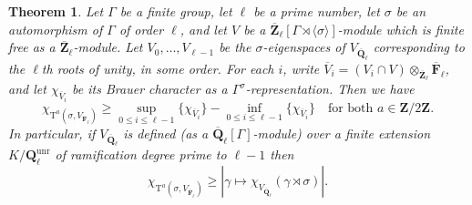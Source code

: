 \documentclass[reqno]{amsart}
\numberwithin{equation}{subsection}
\newcommand{\F}{\mathbf{F}}
\newcommand{\Q}{\mathbf{Q}}
\newcommand{\Z}{\mathbf{Z}}
\newcommand{\ol}[1]{\overline{#1}}
\newcommand{\rT}{\ensuremath{\mathrm{T}}\xspace}
\newtheorem{thm}{Theorem}[subsection]
\theoremstyle{remark}
\numberwithin{equation}{subsection}
\numberwithin{figure}{subsection}
\begin{document}
\begin{thm}\label{thm:eigenvalues-and-jordan-blocks-variant}
    Let $\Gamma$ be a finite group, let $\ell$ be a prime number, let $\sigma$ be an automorphism of $\Gamma$ of order $\ell$, and let $V$ be a $\ol\Z_\ell[\Gamma \rtimes \langle\sigma\rangle]$-module which is finite free as a $\ol\Z_\ell$-module. Let $V_0, \ldots, V_{\ell-1}$ be the $\sigma$-eigenspaces of $V_{\ol \Q_\ell}$ corresponding to the $\ell$th roots of unity, in some order. For each $i$, write $\ol V_i = (V_i \cap V) \otimes_{\ol\Z_\ell}\ol\F_\ell$, and let $\chi_{\ol V_i}$ be its Brauer character as a $\Gamma^\sigma$-representation. Then we have
    \begin{equation}\label{eqn:Brauer-char-lower-bound}
    \chi_{\rT^a(\sigma, V_{\ol\F_\ell})} \geq \sup_{0 \leq i \leq \ell-1}\{\chi_{\ol V_i}\} - \inf_{0 \leq i \leq \ell-1}\{\chi_{\ol V_i}\} \quad \text{for both $a \in \Z/2\Z$.}
    \end{equation}
    In particular, if $V_{\ol\Q_\ell}$ is defined (as a $\ol\Q_\ell[\Gamma]$-module) over a finite extension $K/\Q_\ell^{\mathrm{unr}}$ of ramification degree prime to $\ell-1$ then
    \begin{equation}\label{eqn:Brauer-unramified-lower-bound}
    \chi_{\rT^a(\sigma, V_{\ol\F_\ell})} \geq |\gamma \mapsto \chi_{V_{\ol\Q_\ell}}(\gamma \rtimes \sigma)|.
    \end{equation}
\end{thm}
\end{document}
